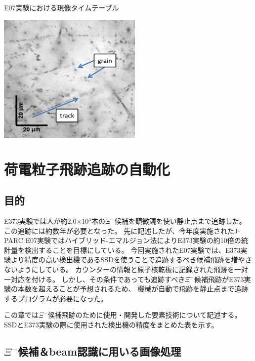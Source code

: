 \documentclass[12pt,a4paper]{jarticle}
\begin{document}
\begin{table}[htbp]
\centering
\caption{E07実験における現像タイムテーブル\label{tab:gennzou_timetable}}
\begin{center}
    \includegraphics[width=70mm]{grainfog.png}
\end{center}
\end{table}


\newpage
\section{荷電粒子飛跡追跡の自動化}
\subsection{目的}
E373実験では人が約2.0×10$^4$本の$\Xi$$^-$候補を顕微鏡を使い静止点まで追跡した。
この追跡には約数年が必要となった。
先に記述したが、今年度実施されたJ-PARC E07実験ではハイブリッド-エマルジョン法によりE373実験の約10倍の統計量を検出することを目標にしている。
今回実施されたE07実験では、E373実験より精度の高い検出機であるSSDを使うことで追跡するべき候補飛跡を増やさないようにしている。
カウンターの情報と原子核乾板に記録された飛跡を一対一対応を付ける。
しかし、その条件であっても追跡すべき$\Xi$$^-$候補飛跡がE373実験の本数を超えることが予想されるため、
機械が自動で飛跡を静止点まで追跡するプログラムが必要になった。
\par
この章では$\Xi$$^-$候補飛跡のために使用・開発した要素技術について記述する。
SSDとE373実験の際に使用された検出機の精度をまとめた表を示す。
\subsection{$\Xi$$^-$候補＆beam認識に用いる画像処理}
\end{document}
